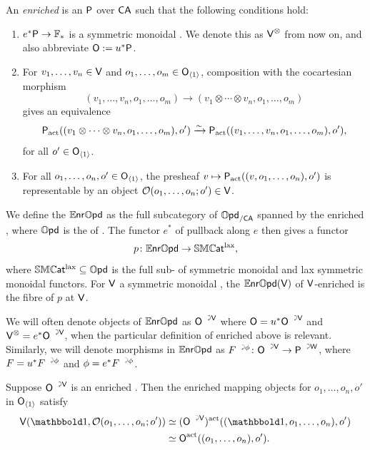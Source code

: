 \documentclass[a4paper,11pt]{article}
\begin{document}
\begin{defn}
  An \emph{enriched \iopd{}} is an \iopd{} $\textup{\textsf{P}}$ over $\textup{\textsf{CA}}$ such that
  the following conditions hold:
  \begin{enumerate}[(1)]
  \item $e^{*}\oP \to \xF_{*}$ is a symmetric monoidal \icat{}. We
    denote this as $\textup{\textsf{V}}^{\otimes}$ from now on, and also abbreviate
    $\textup{\textsf{O}} := u^{*}\textup{\textsf{P}}$.
  \item For $v_{1},\dots,v_{n} \in \textup{\textsf{V}}$ and $o_{1},\dots,o_{m} \in
    \textup{\textsf{O}}_{\langle 1 \rangle}$, composition with the cocartesian morphism
    \[ (v_{1},\dots,v_{n},o_{1},\dots,o_{m}) \to (v_{1} \otimes \cdots
      \otimes v_{n}, o_{1},\dots,o_{m})\]
    gives an equivalence
    \[ \oP_{\act}((v_{1} \otimes \cdots
      \otimes v_{n}, o_{1},\dots,o_{m}), o') \isoto
      \oP_{\act}((v_{1},\dots,v_{n},o_{1},\dots,o_{m}), o'),\]
    for all $o' \in \textup{\textsf{O}}_{\langle 1 \rangle}$.
  \item For all $o_{1},\ldots,o_{n},o' \in \textup{\textsf{O}}_{\langle 1 \rangle}$, the
    presheaf $v \mapsto \textup{\textsf{P}}_{\text{\textup{act}}}((v, o_{1},\ldots,o_{n}), o')$ is
    representable by an object $\mathcal{O}(o_{1},\ldots,o_{n}; o') \in \textup{\textsf{V}}$.
  \end{enumerate}
  We define the \itcat{} $\mathbb{E}\mkern-0.5mu\textsf{\textup{nr}}\mathbb{O}\mkern-0.5mu\textsf{\textup{pd}}$ as the full
  subcategory of $\mathbb{O}\mkern-0.5mu\textsf{\textup{pd}}_{/\textup{\textsf{CA}}}$ spanned by the enriched \iopds{},
  where $\mathbb{O}\mkern-0.5mu\textsf{\textup{pd}}$ is the \itcat{} of \iopds{}. The
  functor $e^{*}$ of pullback along $e$ then gives a functor
  \[ p \colon \ENROPD \to \SMCATl,\] where
  $\mathbb{SMC}\mkern-0.5mu\textsf{\textup{at}}^{\text{\textup{lax}}} \subseteq \mathbb{O}\mkern-0.5mu\textsf{\textup{pd}}$ is the full sub-\itcat{} of symmetric
  monoidal \icats{} and lax symmetric monoidal functors. For $\textup{\textsf{V}}$ a
  symmetric monoidal \icat{}, the \itcat{} $\mathbb{E}\mkern-0.5mu\textsf{\textup{nr}}\mathbb{O}\mkern-0.5mu\textsf{\textup{pd}}(\textup{\textsf{V}})$ of
  $\textup{\textsf{V}}$-enriched \iopds{} is the fibre of $p$ at $\textup{\textsf{V}}$.
\end{defn}


\begin{notation}
  We will often denote objects of $\mathbb{E}\mkern-0.5mu\textsf{\textup{nr}}\mathbb{O}\mkern-0.5mu\textsf{\textup{pd}}$ as $\uract{O}{V}$ where
  $\oO = u^{*}\uract{O}{V}$ and
  $\oV^{\otimes} = e^{*}\uract{O}{V}$, when the particular definition
  of enriched \iopds{} above is relevant. Similarly, we will denote
  morphisms in $\mathbb{E}\mkern-0.5mu\textsf{\textup{nr}}\mathbb{O}\mkern-0.5mu\textsf{\textup{pd}}$ as
  $\ract{F}{\phi} \colon \uract{O}{V} \to \uract{P}{W}$, where
  $F = u^{*}\ract{F}{\phi}$ and $\phi = e^{*}\ract{F}{\phi}$.
\end{notation}

\begin{observation}
  Suppose $\uract{O}{V}$ is an enriched \iopd{}. Then the enriched
  mapping objects for $o_{1},\dots,o_{n},o'$ in $\textup{\textsf{O}}_{\langle 1 \rangle}$
  satisfy
  \[
    \begin{split}
      \oV(\bbone, \eO(o_{1},\dots,o_{n};o')) & \simeq
                                               (\uract{O}{V})^{\act}((\bbone, o_{1},\dots,o_{n}), o') \\
      & \simeq \oO^{\act}((o_{1},\dots,o_{n}), o').
    \end{split}
  \]
\end{observation}
\end{document}
